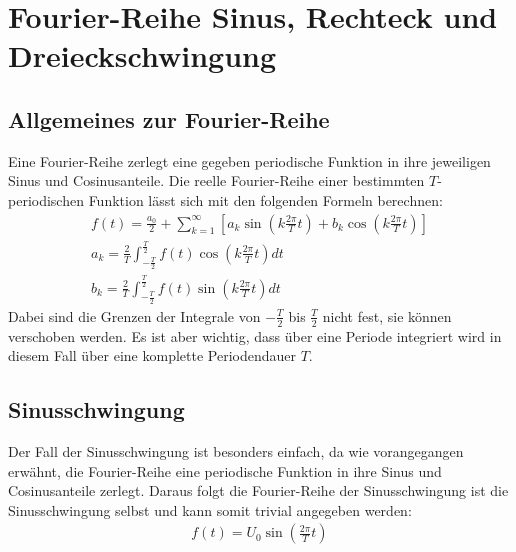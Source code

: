 
\section{Fourier-Reihe Sinus, Rechteck und Dreieckschwingung}
\label{sec:fourierseries}
\subsection*{Allgemeines zur Fourier-Reihe}
\label{sub:fourierseriesAllgemein}
Eine Fourier-Reihe zerlegt eine gegeben periodische Funktion in ihre jeweiligen Sinus und Cosinusanteile. Die reelle Fourier-Reihe einer bestimmten $T$-periodischen Funktion lässt sich mit den folgenden Formeln berechnen:
\begin{gather}
    f(t) = \frac{a_0}{2} + \sum^{\infty}_{k=1} \left[a_k \sin(k\frac{2\pi}{T} t) +b_k \cos(k\frac{2\pi}{T} t)\right]\\
    a_k = \frac{2}{T} \int^{\frac{T}{2}}_{-\frac{T}{2}} f(t)\cos(k \frac{2\pi}{T} t)dt\\
    b_k = \frac{2}{T} \int^{\frac{T}{2}}_{-\frac{T}{2}} f(t)\sin(k \frac{2\pi}{T} t)dt
\end{gather}
Dabei sind die Grenzen der Integrale von $-\frac{T}{2}$ bis $\frac{T}{2}$ nicht fest, sie können verschoben werden. Es ist aber wichtig, dass über eine Periode integriert wird in diesem Fall über eine komplette Periodendauer $T$.
\subsection*{Sinusschwingung}
Der Fall der Sinusschwingung ist besonders einfach, da wie vorangegangen erwähnt, die Fourier-Reihe eine periodische Funktion in ihre Sinus und Cosinusanteile zerlegt. Daraus folgt die Fourier-Reihe der Sinusschwingung ist die Sinusschwingung selbst und kann somit trivial angegeben werden:
\begin{gather}
    f(t) = U_0\sin(\frac{2\pi}{T} t)
\end{gather}